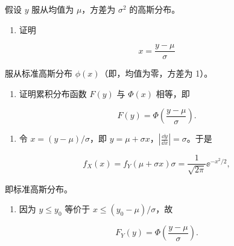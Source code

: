 \begin{question}
假设 \(y\) 服从均值为 \(\mu\)，方差为 \(\sigma^2\) 的高斯分布。

\begin{enumerate}
\item
  证明
\end{enumerate}

\[
x=\frac{y-\mu}{\sigma}
\]

服从标准高斯分布 \(\phi(x)\)（即，均值为零，方差为 1）。

\begin{enumerate}[start=2]
\item
  证明累积分布函数 \(F(y)\) 与 \(\Phi(x)\) 相等，即
\end{enumerate}

\[
F(y)=\Phi\left(\frac{y-\mu}{\sigma}\right).
\]
\begin{solution}
\begin{enumerate}
\item
  令 \(x=(y-\mu)/\sigma\)，即
  \(y=\mu+\sigma x\)，\(\left|\frac{\dd y}{\dd x}\right|=\sigma\)。于是
\end{enumerate}

\[
f_X(x)=f_Y(\mu+\sigma x)\sigma
=\frac1{\sqrt{2\pi}}\ee^{-x^2/2},
\]

即标准高斯分布。

\begin{enumerate}[start=2]
\item
  因为 \(y\le y_0\) 等价于 \(x\le (y_0-\mu)/\sigma\)，故
\end{enumerate}

\[
F_Y(y)=\Phi\left(\frac{y-\mu}{\sigma}\right).
\]
\end{solution}
\end{question}


